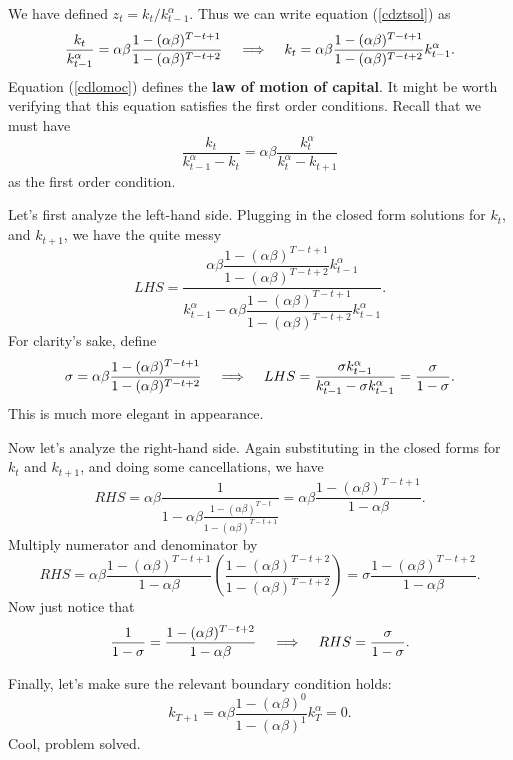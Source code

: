 \documentclass[12pt]{article}
\newcommand{\Lindent}{\hspace{.4cm} \Longrightarrow \hspace{.4cm}}
\theoremstyle{definition}
\begin{document}
We have defined $z_t = k_t / k^{\alpha}_{t-1}$.  Thus we can write equation (\ref{cdztsol}) as 
\begin{equation}
	\frac{k_t}{k^{\alpha}_{t-1}} = 	\alpha \beta\frac{ 1 - (\alpha \beta)^{T -t +1}}{ 1 - (\alpha \beta)^{T -t +2}} \Lindent k_t = \alpha \beta \frac{ 1 - (\alpha \beta)^{T -t +1}}{ 1 - (\alpha \beta)^{T -t +2}}k^{\alpha}_{t-1}. \label{cdlomoc} 
\end{equation}
Equation (\ref{cdlomoc}) defines the \textbf{law of motion of capital}. It might be worth verifying that this equation satisfies the first order conditions. Recall that we must have
	\[\frac{k_t}{k_{t-1}^{\alpha} - k_t}= \alpha \beta \frac{ k_t^{\alpha}}{k_t^{\alpha} - k_{t+1}}	\]
as the first order condition.

Let's first analyze the left-hand side. Plugging in the closed form solutions for $k_t$, and $k_{t+1}$, we have the quite messy
	\[LHS = \dfrac{ \alpha \beta \dfrac{ 1 - (\alpha \beta)^{T -t +1}}{ 1 - (\alpha \beta)^{T -t +2}}k^{\alpha}_{t-1}}{k_{t-1}^{\alpha} -  \alpha \beta\dfrac{ 1 - (\alpha \beta)^{T -t +1}}{ 1 - (\alpha \beta)^{T -t +2}}k^{\alpha}_{t-1}}.\]
For clarity's sake, define 
	\[ \sigma = \alpha \beta \frac{ 1 - (\alpha \beta)^{T -t +1}}{ 1 - (\alpha \beta)^{T -t +2}} \Lindent LHS = \frac{ \sigma k^{\alpha}_{t-1}}{k_{t-1}^{\alpha} -  \sigma k^{\alpha}_{t-1}} = \frac{\sigma}{1 - \sigma}.\]
This is much more elegant in appearance.

Now let's analyze the right-hand side. Again substituting in the closed forms for $k_t$ and $k_{t+1}$, and doing some cancellations, we have
	\[	RHS = \alpha \beta \frac{1}{1 - \alpha \beta \frac{ 1 - (\alpha \beta)^{T -t}}{ 1 - (\alpha \beta)^{T -t +1}}} = \alpha \beta \frac{1 - (\alpha \beta)^{T -t +1}}{ 1 - \alpha \beta}.	\]
Multiply numerator and denominator by 
\[	RHS =  \alpha \beta \frac{1 - (\alpha \beta)^{T -t +1}}{ 1 - \alpha \beta} \left( \frac{ 1 - (\alpha \beta)^{T -t +2}}{ 1 - (\alpha \beta)^{T -t +2}} \right) = \sigma \frac{ 1 - (\alpha \beta)^{T -t +2}}{1 - \alpha \beta}.	\]
Now just notice that 
	\[ \frac{1}{1 - \sigma} =   \frac{   1 - (\alpha \beta)^{T -t +2} }{ 1 - \alpha \beta} \Lindent RHS= \frac{\sigma}{1- \sigma}.	\]

Finally, let's make sure the relevant boundary condition holds:
\[	 k_{T+1} = \alpha \beta \frac{ 1 - (\alpha \beta)^{0}}{ 1 - (\alpha \beta)^{1}}k^{\alpha}_{T} =0. \]
Cool, problem solved. 
\end{document}
